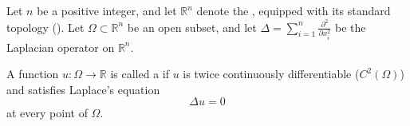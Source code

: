 \begin{definition} \label{definition:harmonic_function_on_an_open_subset_of_euclidean_n_space}
Let $n$ be a positive integer, and let $\mathbb{R}^n$ denote the , equipped with its standard topology (). Let $\Omega \subset \mathbb{R}^n$ be an open subset, and let $\Delta = \sum_{i=1}^n \frac{\partial^2}{\partial x_i^2}$ be the Laplacian operator on $\mathbb{R}^n$.

A function $u : \Omega \to \mathbb{R}$ is called a  if $u$ is twice continuously differentiable ($C^2(\Omega)$) and satisfies Laplace's equation
$$\Delta u = 0$$
at every point of $\Omega$.
\end{definition}